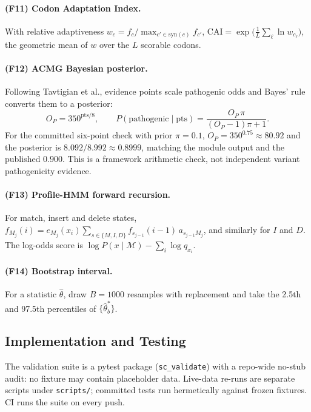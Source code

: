 \documentclass[11pt]{article}
\begin{document}
\paragraph{(F11) Codon Adaptation Index.} With relative adaptiveness
$w_c = f_c/\max_{c'\in\mathrm{syn}(c)} f_{c'}$,
$\mathrm{CAI} = \exp\big(\frac1L\sum_{\ell}\ln w_{c_\ell}\big)$, the geometric
mean of $w$ over the $L$ scorable codons.

\paragraph{(F12) ACMG Bayesian posterior.} Following Tavtigian et al., evidence points scale pathogenic odds and Bayes' rule converts them to a posterior:
\begin{equation}\label{eq:acmg-posterior}
O_P=350^{\mathrm{pts}/8},\qquad
P(\mathrm{pathogenic}\mid\mathrm{pts})
=\frac{O_P\,\pi}{(O_P-1)\pi+1}.
\end{equation}
For the committed six-point check with prior $\pi=0.1$, $O_P=350^{0.75}\approx80.92$ and the posterior is $8.092/8.992\approx0.8999$, matching the module output and the published $0.900$. This is a framework arithmetic check, not independent variant pathogenicity evidence.

\paragraph{(F13) Profile-HMM forward recursion.} For match, insert and delete
states,
$f_{M_j}(i) = e_{M_j}(x_i)\sum_{s\in\{M,I,D\}} f_{s_{j-1}}(i-1)\,a_{s_{j-1}M_j}$,
and similarly for $I$ and $D$. The log-odds score is
$\log P(x\mid\mathcal{M}) - \sum_i \log q_{x_i}$.

\paragraph{(F14) Bootstrap interval.} For a statistic $\hat\theta$, draw
$B=1000$ resamples with replacement and take the 2.5th and 97.5th percentiles of
$\{\hat\theta^{*}_b\}$.


\subsection{Implementation and Testing}
The validation suite is a pytest package (\texttt{sc\_validate}) with a
repo-wide no-stub audit: no fixture may contain placeholder data. Live-data
re-runs are separate scripts under \texttt{scripts/}; committed tests run
hermetically against frozen fixtures. CI runs the suite on every push.
\end{document}

